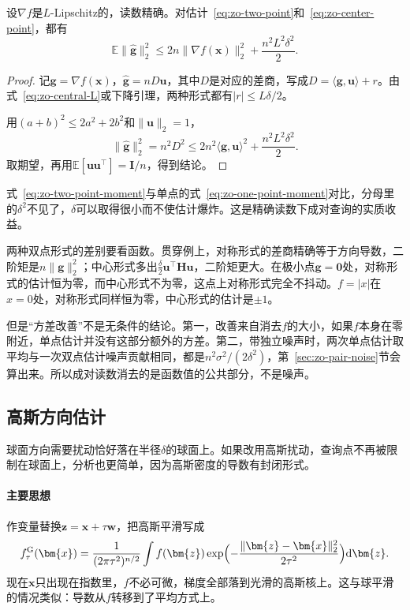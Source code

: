 \begin{lemma}[双点估计的二阶矩]
\label{lem:zo-two-point-moment}
设$\nabla f$是$L$-Lipschitz的，读数精确。对估计~\eqref{eq:zo-two-point}和~\eqref{eq:zo-center-point}，都有
\begin{equation}
 \mathbb{E}\lVert\hat{\bm{g}}\rVert_2^2\leq 2n\lVert\nabla f(\bm{x})\rVert_2^2+\frac{n^2L^2\delta^2}{2}.
 \label{eq:zo-two-point-moment}
\end{equation}
\end{lemma}

\begin{proof}
记$\bm{g}=\nabla f(\bm{x})$，$\hat{\bm{g}}=nD\bm{u}$，其中$D$是对应的差商，写成$D=\langle\bm{g},\bm{u}\rangle+r$。由式~\eqref{eq:zo-central-L}或下降引理，两种形式都有$\lvert r\rvert\leq L\delta/2$。

用$(a+b)^2\leq2a^2+2b^2$和$\lVert\bm{u}\rVert_2=1$，
\[
 \lVert\hat{\bm{g}}\rVert_2^2=n^2D^2\leq 2n^2\langle\bm{g},\bm{u}\rangle^2+\frac{n^2L^2\delta^2}{2}.
\]
取期望，再用$\mathbb{E}[\bm{u}\bm{u}^\top]=\bm{I}/n$，得到结论。
\end{proof}

式~\eqref{eq:zo-two-point-moment}与单点的式~\eqref{eq:zo-one-point-moment}对比，分母里的$\delta^2$不见了，$\delta$可以取得很小而不使估计爆炸。这是精确读数下成对查询的实质收益。

两种双点形式的差别要看函数。贯穿例上，对称形式的差商精确等于方向导数，二阶矩是$n\lVert\bm{g}\rVert_2^2$；中心形式多出$\tfrac{\delta}{2}\bm{u}^\top\bm{H}\bm{u}$，二阶矩更大。在极小点$\bm{g}=\bm{0}$处，对称形式的估计恒为零，而中心形式不为零，这点上对称形式完全不抖动。$f=\lvert x\rvert$在$x=0$处，对称形式同样恒为零，中心形式的估计是$\pm1$。

但是“方差改善”不是无条件的结论。第一，改善来自消去$f$的大小，如果$f$本身在零附近，单点估计并没有这部分额外的方差。第二，带独立噪声时，两次单点估计取平均与一次双点估计噪声贡献相同，都是$n^2\sigma^2/(2\delta^2)$，第~\ref{sec:zo-pair-noise}节会算出来。所以成对读数消去的是函数值的公共部分，不是噪声。

\subsection{高斯方向估计}
\label{sec:zo-gaussian}

球面方向需要扰动恰好落在半径$\delta$的球面上。如果改用高斯扰动，查询点不再被限制在球面上，分析也更简单，因为高斯密度的导数有封闭形式。

\paragraph{主要思想}
作变量替换$\bm{z}=\bm{x}+\tau\bm{w}$，把高斯平滑写成
\[
 f^{\mathrm{G}}_{\tau}(\bm{x})=\frac{1}{(2\pi\tau^2)^{n/2}}\int f(\bm{z})\exp\Bigl(-\frac{\lVert\bm{z}-\bm{x}\rVert_2^2}{2\tau^2}\Bigr)\mathrm{d}\bm{z}.
\]
现在$\bm{x}$只出现在指数里，$f$不必可微，梯度全部落到光滑的高斯核上。这与球平滑的情况类似：导数从$f$转移到了平均方式上。

